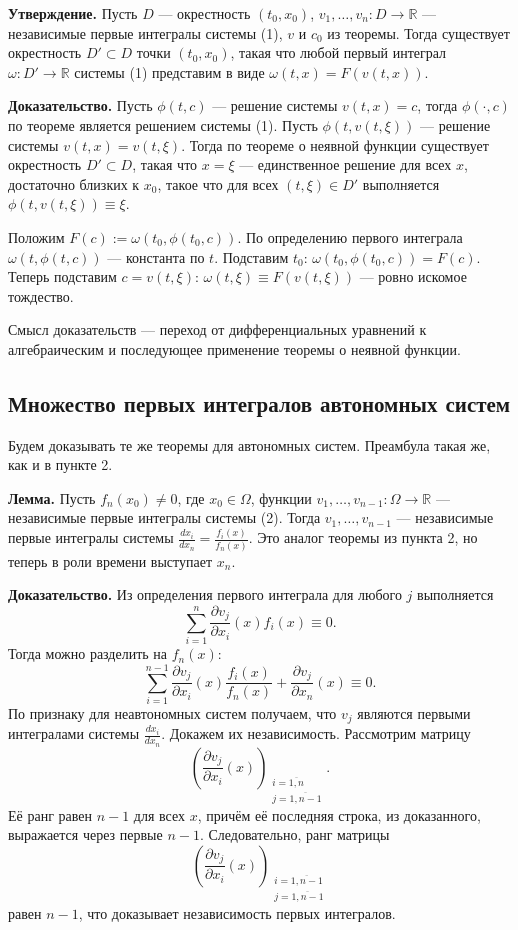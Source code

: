 \QED


\textbf{Утверждение.} Пусть $D$ --- окрестность $(t_0, x_0)$, $v_1, \dots, v_n: D \to \mathbb R$ --- независимые первые интегралы системы (1), $v$ и $c_0$ из теоремы.
Тогда существует окрестность $D' \subset D$ точки $(t_0, x_0)$, такая что любой первый интеграл $\omega: D' \to \mathbb R$ системы (1) представим в виде $\omega(t, x) = F(v(t, x))$.

\textbf{Доказательство.} Пусть $\phi(t, c)$ --- решение системы $v(t, x) = c$, тогда $\phi(\cdot, c)$ по теореме является решением системы (1).
Пусть $\phi(t, v(t, \xi))$ --- решение системы $v(t, x) = v(t, \xi)$.
Тогда по теореме о неявной функции существует окрестность $D' \subset D$, такая что $x = \xi$ --- единственное решение для всех $x$, достаточно близких к $x_0$, такое что для всех $(t, \xi) \in D'$ выполняется $\phi(t, v(t, \xi)) \equiv \xi$.

Положим $F(c) := \omega(t_0, \phi(t_0, c))$.
По определению первого интеграла $\omega(t, \phi(t, c))$ --- константа по $t$.
Подставим $t_0$: $\omega(t_0, \phi(t_0, c)) = F(c)$.
Теперь подставим $c = v(t, \xi)$: $\omega(t, \xi) \equiv F(v(t, \xi))$ --- ровно искомое тождество.

\QED

Смысл доказательств --- переход от дифференциальных уравнений к алгебраическим и последующее применение теоремы о неявной функции.

\subsection{Множество первых интегралов автономных систем}
Будем доказывать те же теоремы для автономных систем.
Преамбула такая же, как и в пункте 2.

\textbf{Лемма.} Пусть $f_n(x_0) \ne 0$, где $x_0 \in \Omega$, функции $v_1, \dots, v_{n-1}: \Omega \to \mathbb R$ --- независимые первые интегралы системы (2).
Тогда $v_1, \dots, v_{n-1}$ --- независимые первые интегралы системы $\frac{d x_i}{d x_n} = \frac{f_i(x)}{f_n(x)}$.
Это аналог теоремы из пункта 2, но теперь в роли времени выступает $x_n$.

\textbf{Доказательство.} Из определения первого интеграла для любого $j$ выполняется
\[
    \sum_{i=1}^{n} \frac{\partial v_j}{\partial x_i}(x) f_i(x) \equiv 0.
\]
Тогда можно разделить на $f_n(x)$:
\[
    \sum_{i=1}^{n-1} \frac{\partial v_j}{\partial x_i}(x) \frac{f_i(x)}{f_n(x)} + \frac{\partial v_j}{\partial x_n}(x) \equiv 0.
\]
По признаку для неавтономных систем получаем, что $v_j$ являются первыми интегралами системы $\frac{dx_i}{dx_n}$. Докажем их независимость.
Рассмотрим матрицу
\[
    \left( \frac{\partial v_j}{\partial x_i}(x) \right)_{\substack{i = \overline{1, n} \\ j = \overline{1, n - 1}}}.
\]
Её ранг равен $n - 1$ для всех $x$, причём её последняя строка, из доказанного, выражается через первые $n - 1$.
Следовательно, ранг матрицы
\[
    \left( \frac{\partial v_j}{\partial x_i}(x) \right)_{\substack{i = \overline{1, n - 1} \\ j = \overline{1, n - 1}}}
\]
равен $n - 1$, что доказывает независимость первых интегралов.

